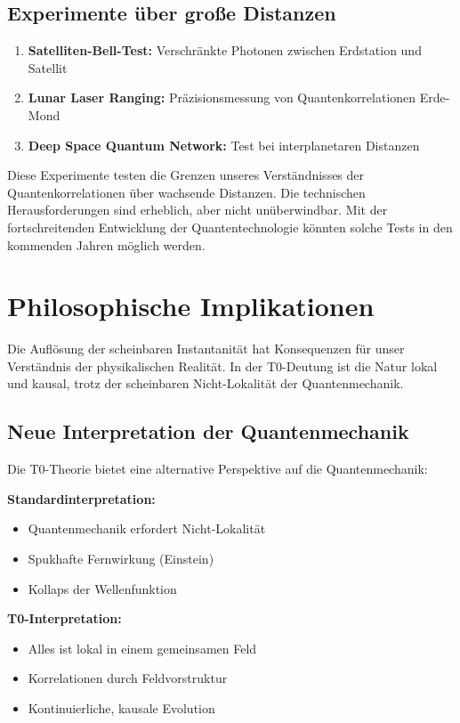 	\subsection{Experimente über große Distanzen}
	
	\begin{enumerate}
		\item \textbf{Satelliten-Bell-Test:} Verschränkte Photonen zwischen Erdstation und Satellit
		\item \textbf{Lunar Laser Ranging:} Präzisionsmessung von Quantenkorrelationen Erde-Mond
		\item \textbf{Deep Space Quantum Network:} Test bei interplanetaren Distanzen
	\end{enumerate}
	
	Diese Experimente testen die Grenzen unseres Verständnisses der Quantenkorrelationen über wachsende Distanzen. Die technischen Herausforderungen sind erheblich, aber nicht unüberwindbar. Mit der fortschreitenden Entwicklung der Quantentechnologie könnten solche Tests in den kommenden Jahren möglich werden.
	
	\section{Philosophische Implikationen}
	
	Die Auflösung der scheinbaren Instantanität hat Konsequenzen für unser Verständnis der physikalischen Realität. In der T0-Deutung ist die Natur lokal und kausal, trotz der scheinbaren Nicht-Lokalität der Quantenmechanik.
	
	\subsection{Neue Interpretation der Quantenmechanik}
	
	Die T0-Theorie bietet eine alternative Perspektive auf die Quantenmechanik:
	
	\begin{tcolorbox}[colback=t0red!5!white, colframe=t0red!75!black, title=Neue Perspektive]
		\textbf{Standardinterpretation:}
		\begin{itemize}
			\item Quantenmechanik erfordert Nicht-Lokalität
			\item Spukhafte Fernwirkung (Einstein)
			\item Kollaps der Wellenfunktion
		\end{itemize}
		
		\textbf{T0-Interpretation:}
		\begin{itemize}
			\item Alles ist lokal in einem gemeinsamen Feld
			\item Korrelationen durch Feldvorstruktur
			\item Kontinuierliche, kausale Evolution
		\end{itemize}
	\end{tcolorbox}
	

